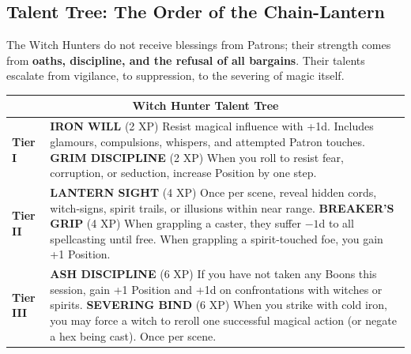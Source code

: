 \documentclass[11pt]{book}
\begin{document}
\subsection{Talent Tree: The Order of the Chain-Lantern}

The Witch Hunters do not receive blessings from Patrons; their strength comes from 
\textbf{oaths, discipline, and the refusal of all bargains}.  
Their talents escalate from vigilance, to suppression, to the severing of magic itself.

\medskip

\begin{center}
\begin{longtable}{|p{2.8cm}|p{11cm}|}
\hline
\multicolumn{2}{|c|}{\textbf{Witch Hunter Talent Tree}} \\ \hline

\textbf{Tier I} &
\textbf{IRON WILL} (2 XP) \newline
Resist magical influence with +1d. Includes glamours, compulsions, whispers, and attempted Patron touches.
\newline\newline
\textbf{GRIM DISCIPLINE} (2 XP) \newline
When you roll to resist fear, corruption, or seduction, increase Position by one step. \\ \hline

\textbf{Tier II} &
\textbf{LANTERN SIGHT} (4 XP) \newline
Once per scene, reveal hidden cords, witch-signs, spirit trails, or illusions within near range.
\newline\newline
\textbf{BREAKER'S GRIP} (4 XP) \newline
When grappling a caster, they suffer \(-1\)d to all spellcasting until free. \newline
When grappling a spirit-touched foe, you gain +1 Position. \\ \hline

\textbf{Tier III} &
\textbf{ASH DISCIPLINE} (6 XP) \newline
If you have not taken any Boons this session, gain +1 Position and +1d on confrontations with witches or spirits.
\newline\newline
\textbf{SEVERING BIND} (6 XP) \newline
When you strike with cold iron, you may force a witch to reroll one successful magical action
(or negate a hex being cast). Once per scene. \\ \hline


\end{longtable}
\end{center}
\end{document}
